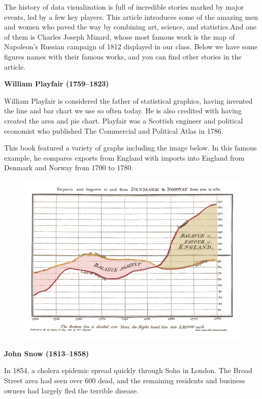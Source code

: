 \documentclass[]{book}
\theoremstyle{definition}
\theoremstyle{definition}
\theoremstyle{definition}
\theoremstyle{remark}
\begin{document}
The history of data visualization is full of incredible stories marked
by major events, led by a few key players. This article introduces some
of the amazing men and women who paved the way by combining art,
science, and statistics.And one of them is Charles Joseph Minard, whose
most famous work is the map of Napoleon's Russian campaign of 1812
displayed in our class. Below we have some figures names with their
famous works, and you can find other stories in the article.

\textbf{William Playfair (1759--1823)}

William Playfair is considered the father of statistical graphics,
having invented the line and bar chart we use so often today. He is also
credited with having created the area and pie chart. Playfair was a
Scottish engineer and political economist who published The Commercial
and Political Atlas in 1786.

This book featured a variety of graphs including the image below. In
this famous example, he compares exports from England with imports into
England from Denmark and Norway from 1700 to 1780.

\begin{figure}
\centering
\includegraphics{images/Playfair.png}
\caption{}
\end{figure}

\textbf{John Snow (1813--1858)}

In 1854, a cholera epidemic spread quickly through Soho in London. The
Broad Street area had seen over 600 dead, and the remaining residents
and business owners had largely fled the terrible disease.
\end{document}
